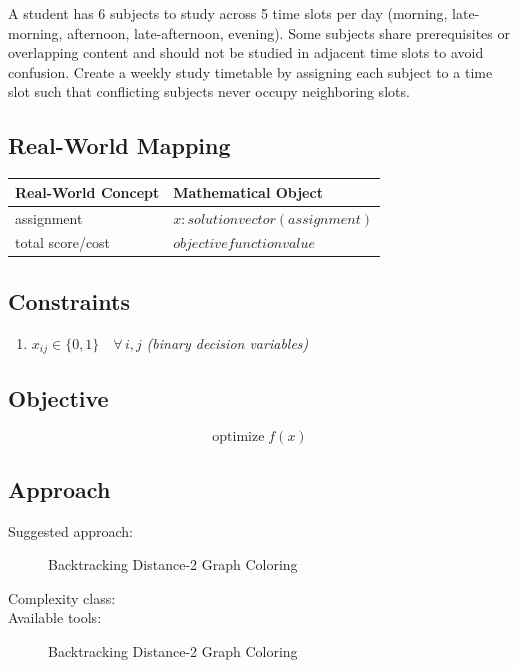 \documentclass[11pt, a4paper]{article}
\begin{document}
A student has 6 subjects to study across 5 time slots per day (morning, late-morning, afternoon, late-afternoon, evening). Some subjects share prerequisites or overlapping content and should not be studied in adjacent time slots to avoid confusion. Create a weekly study timetable by assigning each subject to a time slot such that conflicting subjects never occupy neighboring slots.

\subsection{Real-World Mapping}

\begin{longtable}{ll}
\toprule
\textbf{Real-World Concept} & \textbf{Mathematical Object} \\
\midrule
\endhead
assignment & $x: solution vector (assignment)$ \\
total score/cost & $objective function value$ \\
\bottomrule
\end{longtable}

\subsection{Constraints}

\begin{enumerate}
  \item $x_{ij} \in \{0, 1\} \quad \forall\, i, j$
  \hfill \textit{(binary decision variables)}
\end{enumerate}

\subsection{Objective}

\begin{equation}
\text{optimize} \; f(x)
\end{equation}

\subsection{Approach}

\begin{description}
  \item[Suggested approach:] Backtracking Distance-2 Graph Coloring
  \item[Complexity class:] 
  \item[Available tools:] Backtracking Distance-2 Graph Coloring
\end{description}
\end{document}
